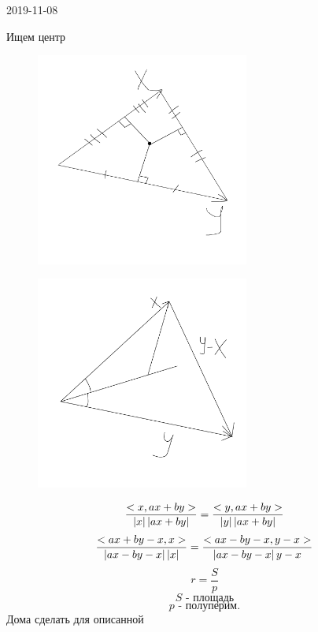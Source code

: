 \documentclass[12pt, fleqn]{article}
\begin{document}
\begin{lect}{2019-11-08}
\begin{Task}[7.1]
        Ищем центр
        \begin{figure}[H]
            \includegraphics[width=7cm]{pics/3.png}
            \centering
        \end{figure}
        \begin{figure}[H]
            \includegraphics[width=7cm]{pics/4.png}
            \centering
        \end{figure}
        
        \[\frac{<x, ax + by>}{\left|x\right|\left|ax + by\right|} = 
        \frac{<y, ax + by>}{\left|y\right|\left|ax + by\right|}\]
        \[\frac{<ax + by - x, x>}{\left|ax - by - x\right|\left|x\right|} = 
        \frac{<ax - by - x, y - x>}{\left|ax - by - x\right|{y - x}}\]
        \[r = \frac{S}{p}\]
        \[S \text{ - площадь}\]
        \[p \text{ - полуперим.}\]
        Дома сделать для описанной
    \end{Task}


\end{lect}
\end{document}
